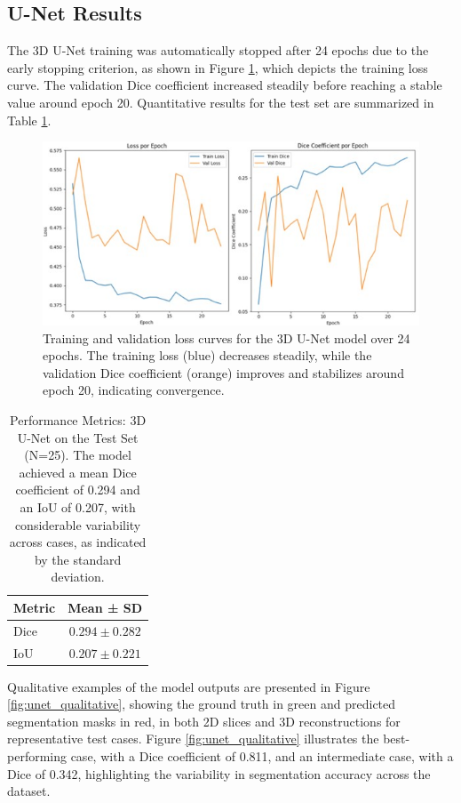 \documentclass[12pt]{article}
\begin{document}
\subsection{U-Net Results} \label{subsec:unet}

The 3D U-Net training was automatically stopped after 24 epochs due to the early stopping criterion, as shown in Figure \ref{fig:unet_loss_curve}, which depicts the training loss curve. The validation Dice coefficient increased steadily before reaching a stable value around epoch 20. Quantitative results for the test set are summarized in Table \ref{tab:unet_metrics}.

\begin{figure}[tp]
    \centering
    \includegraphics[width=\textwidth]{figures/Figure 1.jpg}
    \caption{Training and validation loss curves for the 3D U-Net model over 24 epochs. The training loss (blue) decreases steadily, while the validation Dice coefficient (orange) improves and stabilizes around epoch 20, indicating convergence.}
    \label{fig:unet_loss_curve}
\end{figure}

\begin{table}[tp]
\centering
\begin{tabular}{lc}
\toprule
\textbf{Metric} & \textbf{Mean ± SD} \\
\midrule
Dice & $0.294 \pm 0.282$ \\
IoU & $0.207 \pm 0.221$ \\
\bottomrule
\end{tabular}
\caption{Performance Metrics: 3D U-Net on the Test Set (N=25). The model achieved a mean Dice coefficient of 0.294 and an IoU of 0.207, with considerable variability across cases, as indicated by the standard deviation.}
\label{tab:unet_metrics}
\end{table}

Qualitative examples of the model outputs are presented in Figure \ref{fig:unet_qualitative}, showing the ground truth in green and predicted segmentation masks in red, in both 2D slices and 3D reconstructions for representative test cases. Figure \ref{fig:unet_qualitative} illustrates the best-performing case, with a Dice coefficient of 0.811, and an intermediate case, with a Dice of 0.342, highlighting the variability in segmentation accuracy across the dataset.
\end{document}
